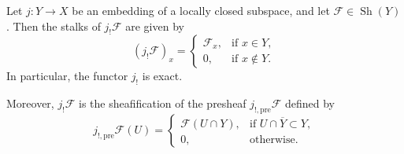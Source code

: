\begin{example}
Let $j \colon Y \to X$ be an embedding of a locally closed subspace, and let $\mathcal{F} \in \operatorname{Sh}(Y)$. Then the stalks of $j_!\mathcal{F}$ are given by
\begin{equation*}
    (j_!\mathcal{F})_x = 
    \begin{cases} 
        \mathcal{F}_x, & \text{if } x \in Y, \\
        0, & \text{if } x \notin Y. 
    \end{cases}
\end{equation*}
In particular, the functor $j_!$ is exact.

Moreover, $j_!\mathcal{F}$ is the sheafification of the presheaf $j_{!,\text{pre}}\mathcal{F}$ defined by
\begin{equation*}
    j_{!,\text{pre}}\mathcal{F}(U) = 
    \begin{cases} 
        \mathcal{F}(U \cap Y), & \text{if } U \cap \overline{Y} \subset Y, \\
        0, & \text{otherwise}.
    \end{cases}
\end{equation*}
\end{example}

